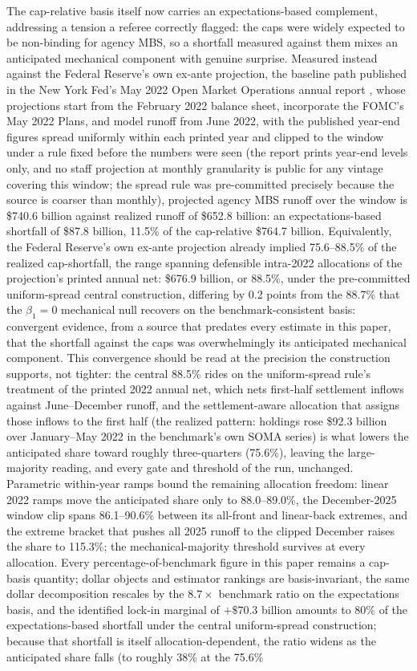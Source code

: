 \documentclass[12pt]{article}
\begin{document}
The cap-relative basis itself now carries an expectations-based complement, addressing a tension a referee correctly flagged: the caps were widely expected to be non-binding for agency MBS, so a shortfall measured against them mixes an anticipated mechanical component with genuine surprise. Measured instead against the Federal Reserve's own ex-ante projection, the baseline path published in the New York Fed's May 2022 Open Market Operations annual report \citep{omo2021}, whose projections start from the February 2022 balance sheet, incorporate the FOMC's May 2022 Plans, and model runoff from June 2022, with the published year-end figures spread uniformly within each printed year and clipped to the window under a rule fixed before the numbers were seen (the report prints year-end levels only, and no staff projection at monthly granularity is public for any vintage covering this window; the spread rule was pre-committed precisely because the source is coarser than monthly), projected agency MBS runoff over the window is \$740.6 billion against realized runoff of \$652.8 billion: an expectations-based shortfall of \$87.8 billion, 11.5\% of the cap-relative \$764.7 billion. Equivalently, the Federal Reserve's own ex-ante projection already implied 75.6--88.5\% of the realized cap-shortfall, the range spanning defensible intra-2022 allocations of the projection's printed annual net: \$676.9 billion, or 88.5\%, under the pre-committed uniform-spread central construction, differing by 0.2 points from the 88.7\% that the $\beta_1 = 0$ mechanical null recovers on the benchmark-consistent basis: convergent evidence, from a source that predates every estimate in this paper, that the shortfall against the caps was overwhelmingly its anticipated mechanical component. This convergence should be read at the precision the construction supports, not tighter: the central 88.5\% rides on the uniform-spread rule's treatment of the printed 2022 annual net, which nets first-half settlement inflows against June--December runoff, and the settlement-aware allocation that assigns those inflows to the first half (the realized pattern: holdings rose \$92.3 billion over January--May 2022 in the benchmark's own SOMA series) is what lowers the anticipated share toward roughly three-quarters (75.6\%), leaving the large-majority reading, and every gate and threshold of the run, unchanged. Parametric within-year ramps bound the remaining allocation freedom: linear 2022 ramps move the anticipated share only to 88.0--89.0\%, the December-2025 window clip spans 86.1--90.6\% between its all-front and linear-back extremes, and the extreme bracket that pushes all 2025 runoff to the clipped December raises the share to 115.3\%; the mechanical-majority threshold survives at every allocation. Every percentage-of-benchmark figure in this paper remains a cap-basis quantity; dollar objects and estimator rankings are basis-invariant, the same dollar decomposition rescales by the $8.7\times$ benchmark ratio on the expectations basis, and the identified lock-in marginal of $+\$70.3$ billion amounts to 80\% of the expectations-based shortfall under the central uniform-spread construction; because that shortfall is itself allocation-dependent, the ratio widens as the anticipated share falls (to roughly 38\% at the 75.6\% 
\end{document}
